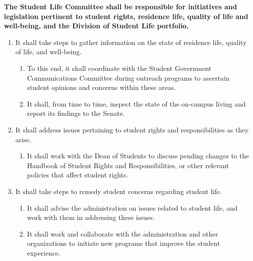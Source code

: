 \item \textbf{The Student Life Committee shall be responsible for initiatives and legislation pertinent to student rights, residence life, quality of life and well-being, and the Division of Student Life portfolio.}
\begin{enumerate}
\item It shall take steps to gather information on the state of residence life, quality of life, and well-being.
\begin{enumerate}
\item To this end, it shall coordinate with the Student Government Communications Committee during outreach programs to
ascertain student opinions and concerns within these areas.
\item It shall, from time to time, inspect the state of the on-campus living and report its findings to the Senate.
\end{enumerate}
\item It shall address issues pertaining to student rights and responsibilities as they arise.
\begin{enumerate}
\item It shall work with the Dean of Students to discuss pending changes to the Handbook of Student Rights and
Responsibilities, or other relevant policies that affect student rights.
\end{enumerate}
\item It shall take steps to remedy student concerns regarding student life.
\begin{enumerate}
\item It shall advise the administration on issues related to student life, and work with them in addressing these issues.
\item It shall work and collaborate with the administration and other organizations to initiate new programs that improve the
student experience.
\end{enumerate}
\end{enumerate}
